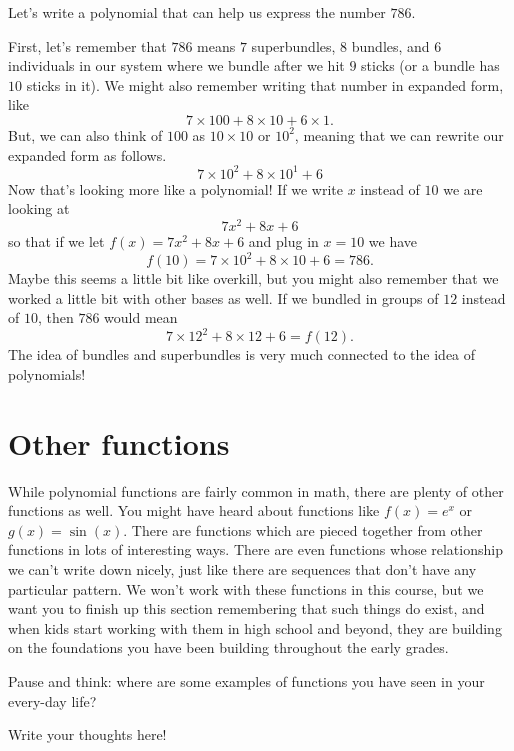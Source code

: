 \documentclass{ximera}
\begin{document}
\begin{example}
Let's write a polynomial that can help us express the number $786$.

First, let's remember that $786$ means $7$ superbundles, $8$ bundles, and $6$ individuals in our system where we bundle after we hit $9$ sticks (or a bundle has $10$ sticks in it). We might also remember writing that number in expanded form, like
\[
7 \times 100 + 8 \times 10 + 6 \times 1.
\]
But, we can also think of $100$ as $10 \times 10$ or $10^2$, meaning that we can rewrite our expanded form as follows.
\[
7 \times 10^2 + 8 \times 10^1 + 6
\]
Now that's looking more like a polynomial! If we write $x$ instead of $10$ we are looking at 
\[
7x^2 + 8 x + 6
\]
so that if we let $f(x) = 7x^2 + 8x + 6$ and plug in $x=10$ we have
\[
f(10) = 7 \times 10^2 + 8 \times 10 + 6 = 786.
\]
Maybe this seems a little bit like overkill, but you might also remember that we worked a little bit with other bases as well. If we bundled in groups of $12$ instead of $10$, then $786$ would mean
\[
7 \times 12^2 + 8 \times 12 + 6 = f(12).
\]
The idea of bundles and superbundles is very much connected to the idea of polynomials!
\end{example}



\section{Other functions}
While polynomial functions are fairly common in math, there are plenty of other functions as well. You might have heard about functions like $f(x) = e^x$ or $g(x) = \sin(x)$. There are functions which are pieced together from other functions in lots of interesting ways. There are even functions whose relationship we can't write down nicely, just like there are sequences that don't have any particular pattern. We won't work with these functions in this course, but we want you to finish up this section remembering that such things do exist, and when kids start working with them in high school and beyond, they are building on the foundations you have been building throughout the early grades.

\begin{question}
Pause and think: where are some examples of functions you have seen in your every-day life?
\begin{freeResponse}
Write your thoughts here!
\end{freeResponse}
\end{question}
\end{document}
